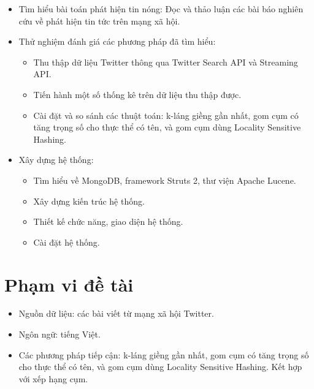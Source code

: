 	\begin{itemize}
		\item Tìm hiểu bài toán phát hiện tin nóng: Đọc và thảo luận các bài báo nghiên cứu về phát hiện tin tức trên mạng xã hội.
		
		\item Thử nghiệm đánh giá các phương pháp đã tìm hiểu:
		\begin{itemize}
			\item Thu thập dữ liệu Twitter thông qua Twitter Search API và Streaming API.
			\item Tiến hành một số thống kê trên dữ liệu thu thập được.
			\item Cài đặt và so sánh các thuật toán: k-láng giềng gần nhất, gom cụm có tăng trọng số cho thực thể có tên, và gom cụm dùng Locality Sensitive Hashing.
		\end{itemize}
	
		\item Xây dựng hệ thống:
		\begin{itemize}
			\item Tìm hiểu về MongoDB, framework Struts 2, thư viện Apache Lucene.
			\item Xây dựng kiến trúc hệ thống.
			\item Thiết kế chức năng, giao diện hệ thống.
			\item Cài đặt hệ thống.
		\end{itemize}
		
	\end{itemize}

\section{Phạm vi đề tài}
\begin{itemize}
	\item Nguồn dữ liệu: các bài viết từ mạng xã hội Twitter.
	\item Ngôn ngữ: tiếng Việt.
	\item Các phương pháp tiếp cận: k-láng giềng gần nhất, gom cụm có tăng trọng số cho thực thể có tên, và gom cụm dùng Locality Sensitive Hashing. Kết hợp với xếp hạng cụm.
\end{itemize}


